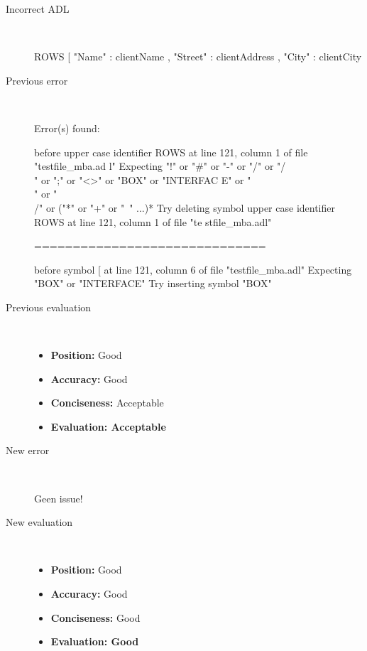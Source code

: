 \hrulefill

\begin{description}
  \item[Incorrect ADL]~\\
\begin{adl}
ROWS [ "Name"   : clientName
    , "Street" : clientAddress
    , "City"   : clientCity\end{adl}
  \item[Previous error]~\\
\begin{haskell}
Error(s) found:

before upper case identifier ROWS at line 121, column 1 of file "testfile_mba.ad
l"
Expecting "!" or "#" or "-" or "/" or "/\\" or ";" or "<>" or "BOX" or "INTERFAC
E" or "\\" or "\\/" or ("*" or "+" or "~" ...)*
Try deleting symbol upper case identifier ROWS at line 121, column 1 of file "te
stfile_mba.adl"

==============================

before symbol [ at line 121, column 6 of file "testfile_mba.adl"
Expecting "BOX" or "INTERFACE"
Try inserting symbol "BOX"

\end{haskell}
  \item[Previous evaluation]~\\
    \begin{itemize}
    \item \textbf{Position:} Good
    \item \textbf{Accuracy:} Good
    \item \textbf{Conciseness:} Acceptable
    \item \textbf{Evaluation: Acceptable}
    \end{itemize}
  \item[New error]~\\
\begin{haskell}
Geen issue!\end{haskell}
  \item[New evaluation]~\\
    \begin{itemize}
    \item \textbf{Position:} Good
    \item \textbf{Accuracy:} Good
    \item \textbf{Conciseness:} Good
    \item \textbf{Evaluation: Good}
    \end{itemize}
  \end{description}

